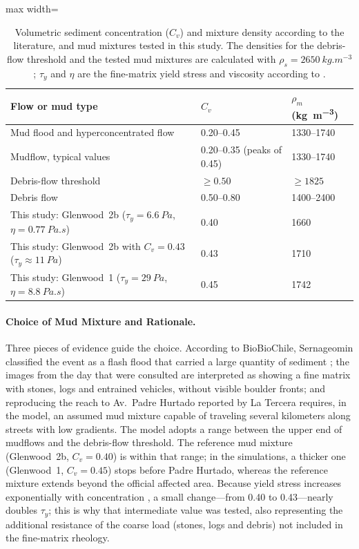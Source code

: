 \begin{table}[htbp]\centering\small
\caption{Volumetric sediment concentration ($C_v$) and mixture density according to the literature, and mud mixtures tested in this study. The densities for the debris-flow threshold and the tested mud mixtures are calculated with $\rho_s=\SI{2650}{kg.m^{-3}}$; $\tau_y$ and $\eta$ are the fine-matrix yield stress and viscosity according to \citet{obrien1988}.}\label{tab:densidades}
\begin{adjustbox}{max width=\textwidth}\begin{tabular}{lll}\toprule
Flow or mud type & $C_v$ & $\rho_m$ (\si{kg.m^{-3}})\\\midrule
Mud flood and hyperconcentrated flow \citep{obrien1988,flo2d2021} & 0.20--0.45 & \numrange{1330}{1740}\\
Mudflow, typical values \citep{flo2d2021} & 0.20--0.35 (peaks of 0.45) & \numrange{1330}{1740}\\
Debris-flow threshold \citep{costa1984,zanuttigh2007} & $\geq0.50$ & $\geq\num{1825}$\\
Debris flow \citep{iverson1997} & 0.50--0.80 & \numrange{1400}{2400}\\\midrule
This study: Glenwood~2b ($\tau_y=\SI{6.6}{Pa}$, $\eta=\SI{0.77}{Pa.s}$) & 0.40 & \num{1660}\\
This study: Glenwood~2b with $C_v=0.43$ ($\tau_y\approx\SI{11}{Pa}$) & 0.43 & \num{1710}\\
This study: Glenwood~1 ($\tau_y=\SI{29}{Pa}$, $\eta=\SI{8.8}{Pa.s}$) & 0.45 & \num{1742}\\
\bottomrule\end{tabular}\end{adjustbox}
\end{table}

\paragraph{Choice of Mud Mixture and Rationale.} Three pieces of evidence guide the choice. According to BioBioChile, Sernageomin classified the event as a flash flood that carried a large quantity of sediment \citep{biobio2026origen}; the images from the day that were consulted are interpreted as showing a fine matrix with stones, logs and entrained vehicles, without visible boulder fronts; and reproducing the reach to Av.\ Padre Hurtado reported by La Tercera \citep{latercera2026} requires, in the model, an assumed mud mixture capable of traveling several kilometers along streets with low gradients. The model adopts a range between the upper end of mudflows and the debris-flow threshold. The reference mud mixture (Glenwood~2b, $C_v=0.40$) is within that range; in the simulations, a thicker one (Glenwood~1, $C_v=0.45$) stops before Padre Hurtado, whereas the reference mixture extends beyond the official affected area. Because yield stress increases exponentially with concentration \citep{obrien1988}, a small change---from 0.40 to 0.43---nearly doubles $\tau_y$; this is why that intermediate value was tested, also representing the additional resistance of the coarse load (stones, logs and debris) not included in the fine-matrix rheology.

